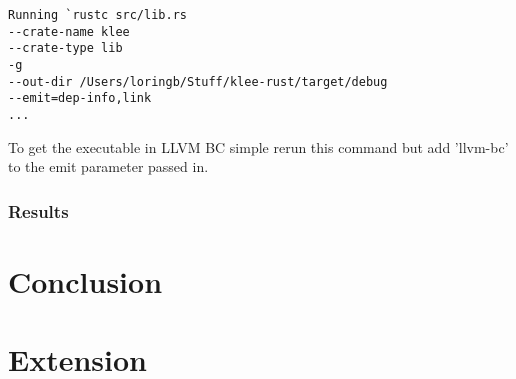 \documentclass{report}
\begin{document}
\begin{lstlisting}
Running `rustc src/lib.rs 
--crate-name klee 
--crate-type lib 
-g
--out-dir /Users/loringb/Stuff/klee-rust/target/debug 
--emit=dep-info,link
...
\end{lstlisting}

To get the executable in LLVM BC simple rerun this command but add 'llvm-bc' to the emit parameter passed in.

\subsection{Results}

\chapter {Conclusion}

\chapter {Extension}
\end{document}
